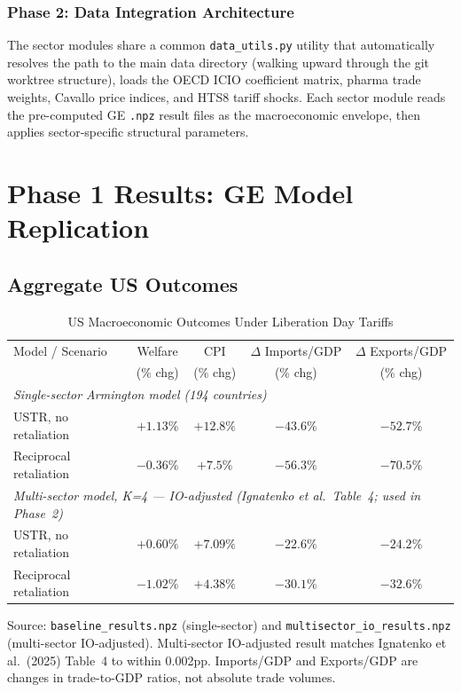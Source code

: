 \documentclass[12pt]{article}
\begin{document}
\subsubsection{Phase 2: Data Integration Architecture}

The sector modules share a common \texttt{data\_utils.py} utility that
automatically resolves the path to the main data directory (walking upward
through the git worktree structure), loads the OECD ICIO coefficient matrix,
pharma trade weights, Cavallo price indices, and HTS8 tariff shocks. Each
sector module reads the pre-computed GE \texttt{.npz} result files as the
macroeconomic envelope, then applies sector-specific structural parameters.

\section{Phase 1 Results: GE Model Replication}

\subsection{Aggregate US Outcomes}

\begin{table}[H]
\centering
\caption{US Macroeconomic Outcomes Under Liberation Day Tariffs}
\label{tab:us_outcomes}
\begin{tabular}{lcccc}
\toprule
Model / Scenario & Welfare & CPI & $\Delta$ Imports/GDP & $\Delta$ Exports/GDP \\
                 & (\% chg) & (\% chg) & (\% chg) & (\% chg) \\
\midrule
\multicolumn{5}{l}{\textit{Single-sector Armington model (194 countries)}} \\[2pt]
USTR, no retaliation & $+1.13\%$ & $+12.8\%$ & $-43.6\%$ & $-52.7\%$ \\
Reciprocal retaliation & $-0.36\%$ & $+7.5\%$ & $-56.3\%$ & $-70.5\%$ \\
\midrule
\multicolumn{5}{l}{\textit{Multi-sector model, K=4 --- IO-adjusted (Ignatenko et al.\ Table~4; used in Phase~2)}} \\[2pt]
USTR, no retaliation & $+0.60\%$ & $+7.09\%$ & $-22.6\%$ & $-24.2\%$ \\
Reciprocal retaliation & $-1.02\%$ & $+4.38\%$ & $-30.1\%$ & $-32.6\%$ \\
\bottomrule
\end{tabular}
\begin{tablenotes}
\small
\item Source: \texttt{baseline\_results.npz} (single-sector) and
\texttt{multisector\_io\_results.npz} (multi-sector IO-adjusted).
Multi-sector IO-adjusted result matches Ignatenko et al.\ (2025) Table~4 to within 0.002pp.
Imports/GDP and Exports/GDP are changes in trade-to-GDP ratios, not absolute trade volumes.
\end{tablenotes}
\end{table}
\end{document}
